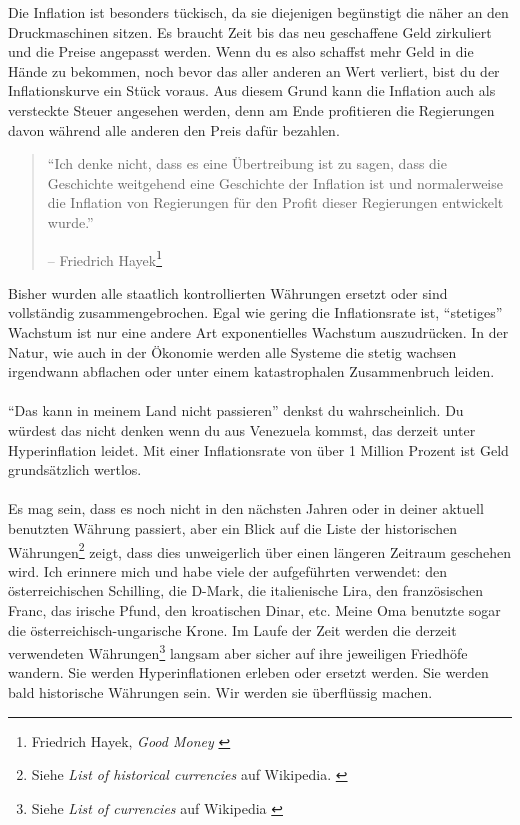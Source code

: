 Die Inflation ist besonders tückisch, da sie diejenigen begünstigt die näher an
den Druckmaschinen sitzen. Es braucht Zeit bis das neu geschaffene Geld
zirkuliert und die Preise angepasst werden. Wenn du es also schaffst mehr Geld
in die Hände zu bekommen, noch bevor das aller anderen an Wert verliert, bist du
der Inflationskurve ein Stück voraus. Aus diesem Grund kann die Inflation auch
als versteckte Steuer angesehen werden, denn am Ende profitieren die Regierungen
davon während alle anderen den Preis dafür bezahlen.

\begin{quotation}\begin{samepage}
\enquote{Ich denke nicht, dass es eine Übertreibung ist zu sagen, dass die
Geschichte weitgehend eine Geschichte der Inflation ist und normalerweise die
Inflation von Regierungen für den Profit dieser Regierungen entwickelt wurde.}
\begin{flushright} -- Friedrich Hayek\footnote{Friedrich Hayek, \textit{Good
Money} \cite{hayek-good-money}}
\end{flushright}\end{samepage}\end{quotation}

\newpage

Bisher wurden alle staatlich kontrollierten Währungen ersetzt oder sind
vollständig zusammengebrochen. Egal wie gering die Inflationsrate ist,
\enquote{stetiges} Wachstum ist nur eine andere Art exponentielles Wachstum
auszudrücken. In der Natur, wie auch in der Ökonomie werden alle Systeme die
stetig wachsen irgendwann abflachen oder unter einem katastrophalen
Zusammenbruch leiden.

\paragraph{}
\enquote{Das kann in meinem Land nicht passieren} denkst du wahrscheinlich. Du
würdest das nicht denken wenn du aus Venezuela kommst, das derzeit unter
Hyperinflation leidet. Mit einer Inflationsrate von über 1 Million Prozent ist
Geld grundsätzlich wertlos. \cite{wiki:venezuela}

\paragraph{}
Es mag sein, dass es noch nicht in den nächsten Jahren oder in deiner aktuell
benutzten Währung passiert, aber ein Blick auf die Liste der historischen
Währungen\footnote{Siehe \textit{List of historical currencies} auf Wikipedia.
\cite{wiki:historical-currencies}} zeigt, dass dies unweigerlich über einen
längeren Zeitraum geschehen wird. Ich erinnere mich und habe viele der
aufgeführten verwendet: den österreichischen Schilling, die D-Mark, die
italienische Lira, den französischen Franc, das irische Pfund, den kroatischen
Dinar, etc. Meine Oma benutzte sogar die österreichisch-ungarische Krone. Im
Laufe der Zeit werden die derzeit verwendeten Währungen\footnote{Siehe
\textit{List of currencies} auf Wikipedia \cite{wiki:list-of-currencies}}
langsam aber sicher auf ihre jeweiligen Friedhöfe wandern. Sie werden
Hyperinflationen erleben oder ersetzt werden. Sie werden bald historische
Währungen sein. Wir werden sie überflüssig machen.

